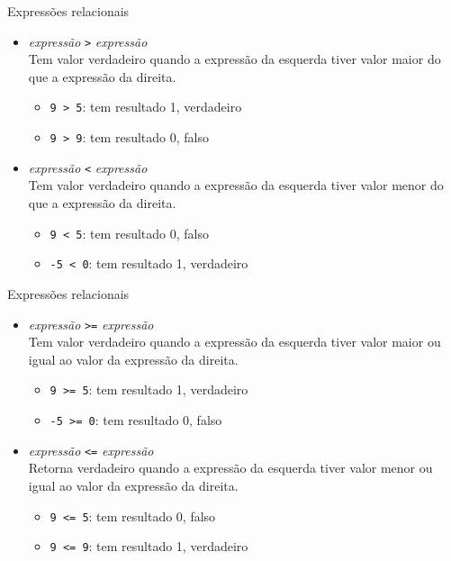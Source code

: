 \documentclass[handout]{beamer}
\newcommand{\cod}[1]{\texttt{#1}}
\begin{document}
\begin{frame}[fragile]{Expressões relacionais}

    \begin{itemize}
        \item {\it expressão} \cod{>} {\it expressão} \\
        Tem valor verdadeiro quando a expressão da esquerda tiver valor maior do que a expressão da direita.
        \begin{itemize}
            \item \cod{9 > 5}: tem resultado 1, verdadeiro
            \item \cod{9 > 9}: tem resultado 0, falso
        \end{itemize}

        \item {\it expressão} \cod{<} {\it expressão} \\
        Tem valor verdadeiro quando a expressão da esquerda tiver valor menor do que a expressão da direita.
        \begin{itemize}
            \item \cod{9 < 5}: tem resultado 0, falso
            \item \cod{-5 < 0}: tem resultado 1, verdadeiro
        \end{itemize}
    \end{itemize}

\end{frame}

\begin{frame}[fragile]{Expressões relacionais}

    \begin{itemize}
        \item {\it expressão} \cod{>=} {\it expressão} \\
        Tem valor verdadeiro quando a expressão da esquerda tiver valor maior ou igual ao valor da expressão da direita.
        \begin{itemize}
            \item \cod{9 >= 5}: tem resultado 1, verdadeiro
            \item \cod{-5 >= 0}: tem resultado 0, falso
        \end{itemize}

        \item {\it expressão} \cod{<=} {\it expressão} \\
        Retorna verdadeiro quando a expressão da esquerda tiver valor menor ou igual ao valor da expressão da direita.
        \begin{itemize}
            \item \cod{9 <= 5}: tem resultado 0, falso
            \item \cod{9 <= 9}: tem resultado 1, verdadeiro
        \end{itemize}
    \end{itemize}

\end{frame}
\end{document}
